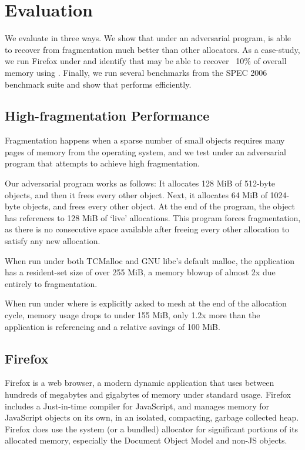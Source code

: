 \section{Evaluation}
\label{sec:evaluation}

We evaluate \Mesh in three ways.  We show that under an adversarial
program, \Mesh is able to recover from fragmentation much better than
other allocators.  As a case-study, we run Firefox under \Mesh and
identify that \Mesh may be able to recover ~10\% of overall memory
using \Mesh.  Finally, we run several benchmarks from the SPEC 2006
benchmark suite and show that \Mesh performs efficiently.

\subsection{High-fragmentation Performance}

Fragmentation happens when a sparse number of small objects requires
many pages of memory from the operating system, and we test \Mesh
under an adversarial program that attempts to achieve high
fragmentation.

Our adversarial program works as follows: It allocates 128 MiB of
512-byte objects, and then it frees every other object.  Next, it
allocates 64 MiB of 1024-byte objects, and frees every other object.
At the end of the program, the object has references to 128 MiB of
`live' allocations.  This program forces fragmentation, as there is no
consecutive space available after freeing every other allocation to
satisfy any new allocation.

When run under both TCMalloc and GNU libc's default malloc, the
application has a resident-set size of over 255 MiB, a memory blowup
of almost 2x due entirely to fragmentation.

When run under \Mesh where \Mesh is explicitly asked to mesh at the
end of the allocation cycle, memory usage drops to under 155 MiB, only
1.2x more than the application is referencing and a relative savings
of 100 MiB.

\subsection{Firefox}

Firefox is a web browser, a modern dynamic application that uses
between hundreds of megabytes and gigabytes of memory under standard
usage.  Firefox includes a Just-in-time compiler for JavaScript, and
manages memory for JavaScript objects on its own, in an isolated,
compacting, garbage collected heap.  Firefox does use the system (or a
bundled) allocator for significant portions of its allocated memory,
especially the Document Object Model and non-JS objects.

